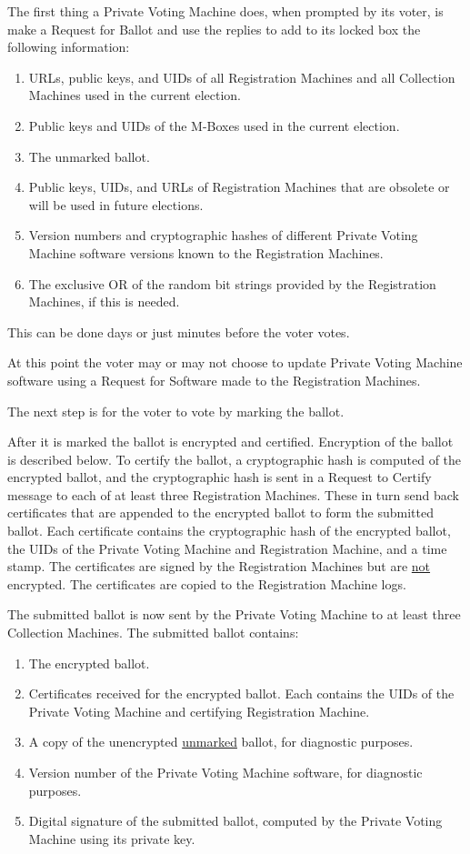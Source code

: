 \documentclass[12pt]{article}
\begin{document}
The first thing a Private Voting Machine does, when prompted by
its voter, is make a Request for Ballot and use the replies to
add to its locked box the following information:
\begin{enumerate}
\setcounter{enumi}{\value{PVM-COUNTER}}
\item URLs, public keys, and UIDs
of all Registration Machines and all Collection
Machines used in the current election.
\item Public keys and UIDs of the M-Boxes used in the current election.
\item The unmarked ballot.
\item Public keys, UIDs, and URLs of Registration Machines that are
obsolete or will be used in future elections.
\item Version numbers and cryptographic hashes of different Private
Voting Machine software versions known to the Registration Machines.
\item The exclusive OR of the random bit strings provided by the
Registration Machines, if this is needed.
\end{enumerate}
This can be done days or just minutes before the voter votes.

At this point
the voter may or may not choose to update Private Voting Machine
software using a Request for Software made to the Registration Machines.

The next step is for the voter to vote by marking the ballot.

After it is marked the ballot is encrypted and certified.  Encryption of the
ballot is described below.  To certify the ballot, a cryptographic hash
is computed of the encrypted ballot, and the cryptographic hash is sent
in a Request to Certify message to each of at least three Registration
Machines.  These in turn send back certificates that are appended
to the encrypted ballot to form the submitted ballot.  Each
certificate contains the cryptographic hash of the encrypted ballot, the
UIDs of the Private Voting Machine and Registration Machine,
and a time stamp.  The certificates
are signed by the Registration Machines but are \underline{not} encrypted.
The certificates are copied to the Registration Machine logs.

The submitted ballot is now sent by the Private Voting
Machine to at least three Collection Machines.  The submitted
ballot contains:
\begin{enumerate}
\item The encrypted ballot.
\item Certificates received for the encrypted ballot.  Each contains the
UIDs of the Private Voting Machine and certifying Registration Machine.
\item A copy of the unencrypted \underline{unmarked} ballot, for
diagnostic purposes.
\item Version number of the Private Voting Machine software, for
diagnostic purposes.
\item Digital signature of the submitted ballot, computed by the
Private Voting Machine using its private key.
\end{enumerate}
\end{document}
